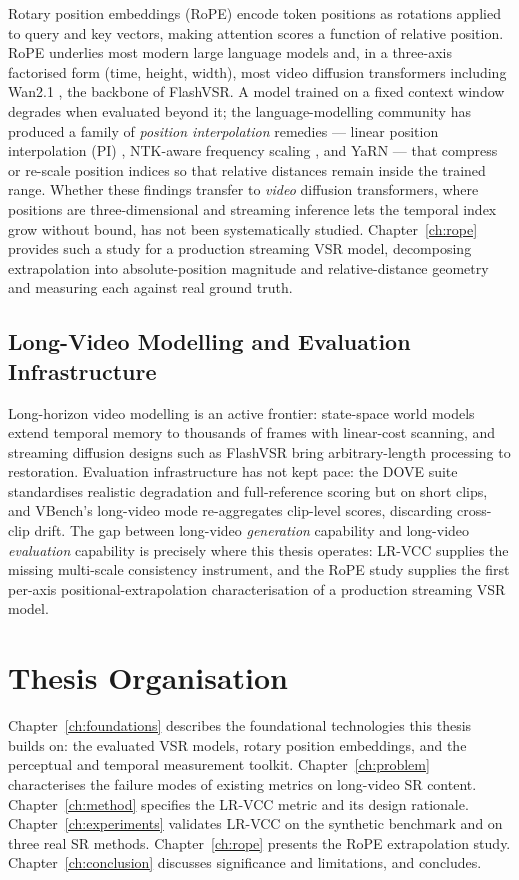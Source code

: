 Rotary position embeddings (RoPE) \cite{su_roformer_2024} encode token positions as
rotations applied to query and key vectors, making attention scores a function of
relative position. RoPE underlies most modern large language models and, in a
three-axis factorised form (time, height, width), most video diffusion transformers
including Wan2.1 \cite{wan_wan_2025}, the backbone of FlashVSR. A model trained on a
fixed context window degrades when evaluated beyond it; the language-modelling community
has produced a family of \emph{position interpolation} remedies --- linear position
interpolation (PI) \cite{chen_pi_2023}, NTK-aware frequency scaling \cite{bloc97_ntk_2023},
and YaRN \cite{peng_yarn_2023} --- that compress or re-scale position indices so that
relative distances remain inside the trained range. Whether these findings transfer to
\emph{video} diffusion transformers, where positions are three-dimensional and streaming
inference lets the temporal index grow without bound, has not been systematically studied.
Chapter~\ref{ch:rope} provides such a study for a production streaming VSR model,
decomposing extrapolation into absolute-position magnitude and relative-distance geometry
and measuring each against real ground truth.

\subsection{Long-Video Modelling and Evaluation Infrastructure}
\label{sec:related:longvideo}

Long-horizon video modelling is an active frontier: state-space world models
\cite{po_longcontext_2025} extend temporal memory to thousands of frames with
linear-cost scanning, and streaming diffusion designs such as FlashVSR bring
arbitrary-length processing to restoration. Evaluation infrastructure has not
kept pace: the DOVE suite \cite{yang_dove_2024} standardises realistic
degradation and full-reference scoring but on short clips, and VBench's
long-video mode re-aggregates clip-level scores, discarding cross-clip drift.
The gap between long-video \emph{generation} capability and long-video
\emph{evaluation} capability is precisely where this thesis operates: LR-VCC
supplies the missing multi-scale consistency instrument, and the RoPE study
supplies the first per-axis positional-extrapolation characterisation of a
production streaming VSR model.

\section{Thesis Organisation}
\label{sec:intro:organisation}

Chapter~\ref{ch:foundations} describes the foundational technologies this thesis builds
on: the evaluated VSR models, rotary position embeddings, and the perceptual and temporal
measurement toolkit. Chapter~\ref{ch:problem} characterises the failure modes of existing
metrics on long-video SR content. Chapter~\ref{ch:method} specifies the LR-VCC metric and
its design rationale. Chapter~\ref{ch:experiments} validates LR-VCC on the synthetic
benchmark and on three real SR methods. Chapter~\ref{ch:rope} presents the RoPE
extrapolation study. Chapter~\ref{ch:conclusion} discusses significance and limitations,
and concludes.
